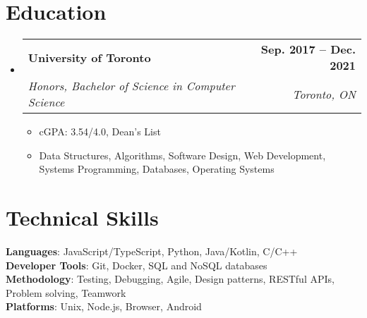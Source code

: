 \documentclass[letterpaper,11pt]{article}
\makeatletter
\newcommand{\resumeItem}[1]{
  \item\small{
    {#1 \vspace{-2pt}}
  }
}
\newcommand{\resumeSubheading}[4]{
  \vspace{-2pt}\item
    \begin{tabular*}{1.0\textwidth}[t]{l@{\extracolsep{\fill}}r}
      \textbf{#1} & \textbf{\small #2} \\
      \textit{\small#3} & \textit{\small #4} \\
    \end{tabular*}\vspace{-7pt}
}
\newcommand{\resumeSubHeadingListStart}{\begin{itemize}[leftmargin=0.0in, label={}]}
\newcommand{\resumeSubHeadingListEnd}{\end{itemize}}
\newcommand{\resumeItemListStart}{\begin{itemize}}
\newcommand{\resumeItemListEnd}{\end{itemize}\vspace{-5pt}}
\makeatother
\begin{document}
\section{Education}
\resumeSubHeadingListStart
\resumeSubheading
{University of Toronto}{Sep. 2017 -- Dec. 2021}
{Honors, Bachelor of Science in Computer Science}{Toronto, ON}
\resumeItemListStart
\resumeItem{cGPA: 3.54/4.0, Dean's List}
\resumeItem{Data Structures, Algorithms, Software Design, Web Development, Systems Programming, Databases, Operating Systems}
\resumeItemListEnd
\resumeSubHeadingListEnd

\section{Technical Skills}
\begin{itemize}[leftmargin=0.15in, label={}]
    \small{\item{
          \textbf{Languages}{: JavaScript/TypeScript, Python, Java/Kotlin, C/C++} \\
          \textbf{Developer Tools}{: Git, Docker, SQL and NoSQL databases} \\
          \textbf{Methodology}{: Testing, Debugging, Agile, Design patterns, RESTful APIs, Problem solving, Teamwork} \\
          \textbf{Platforms}{: Unix, Node.js, Browser, Android} \\
          }}
\end{itemize}
\vspace{-16pt}
\end{document}
